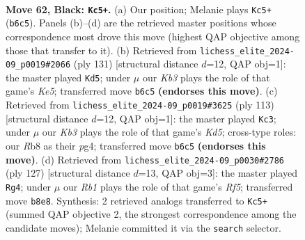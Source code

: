 \documentclass[11pt]{article}
\begin{document}
\clearpage

\begin{figure}[p]\centering
\begin{subfigure}{0.46\textwidth}\centering
\resizebox{\linewidth}{!}{%
\newchessgame
\chessboard[
  setfen={1r6/6Q1/1k6/6P1/4P2P/1K6/8/8 b - - 10 62},
  showmover=false,
  pgfstyle=straightmove, color=movearrow, markmove={b6-c5}
]}
\caption{}
\end{subfigure}\hfill
\begin{subfigure}{0.46\textwidth}\centering
\resizebox{\linewidth}{!}{%
\newchessgame
\chessboard[
  setfen={4r3/2P5/1P6/8/4k3/8/2K5/8 b - - 0 66},
  showmover=false,
  pgfstyle=straightmove, color=movearrow, markmove={e4-d5}
]}
\caption{}
\end{subfigure}
\\[4pt]
\begin{subfigure}{0.46\textwidth}\centering
\resizebox{\linewidth}{!}{%
\newchessgame
\chessboard[
  setfen={5Q2/2K5/8/8/p2k2P1/P7/8/8 b - - 2 57},
  showmover=false,
  pgfstyle=straightmove, color=movearrow, markmove={d4-c3}
]}
\caption{}
\end{subfigure}\hfill
\begin{subfigure}{0.46\textwidth}\centering
\resizebox{\linewidth}{!}{%
\newchessgame
\chessboard[
  setfen={6Q1/3KP3/8/7p/3k1r2/8/8/8 b - - 1 64},
  showmover=false,
  pgfstyle=straightmove, color=movearrow, markmove={f4-g4}
]}
\caption{}
\end{subfigure}
\caption{\textbf{Move 62, Black: \texttt{Kc5+}.} (a) Our position; Melanie plays \texttt{Kc5+} (\texttt{b6c5}). Panels (b)--(d) are the retrieved master positions whose correspondence most drove this move (highest QAP objective among those that transfer to it). (b) Retrieved from \texttt{lichess\_elite\_2024-09\_p0019\#2066} (ply 131) [structural distance $d$=12, QAP obj=1]: the master played \texttt{Kd5}; under $\mu$ our \emph{Kb3} plays the role of that game's \emph{Ke5}; transferred move \texttt{b6c5} \textbf{(endorses this move)}. (c) Retrieved from \texttt{lichess\_elite\_2024-09\_p0019\#3625} (ply 113) [structural distance $d$=12, QAP obj=1]: the master played \texttt{Kc3}; under $\mu$ our \emph{Kb3} plays the role of that game's \emph{Kd5}; cross-type roles: our \emph{R}b8 as their \emph{p}g4; transferred move \texttt{b6c5} \textbf{(endorses this move)}. (d) Retrieved from \texttt{lichess\_elite\_2024-09\_p0030\#2786} (ply 127) [structural distance $d$=13, QAP obj=3]: the master played \texttt{Rg4}; under $\mu$ our \emph{Rb1} plays the role of that game's \emph{Rf5}; transferred move \texttt{b8e8}. Synthesis: 2 retrieved analogs transferred to \texttt{Kc5+} (summed QAP objective 2, the strongest correspondence among the candidate moves); Melanie committed it via the \texttt{search} selector.}
\label{fig:thought-m123}
\end{figure}
\end{document}
